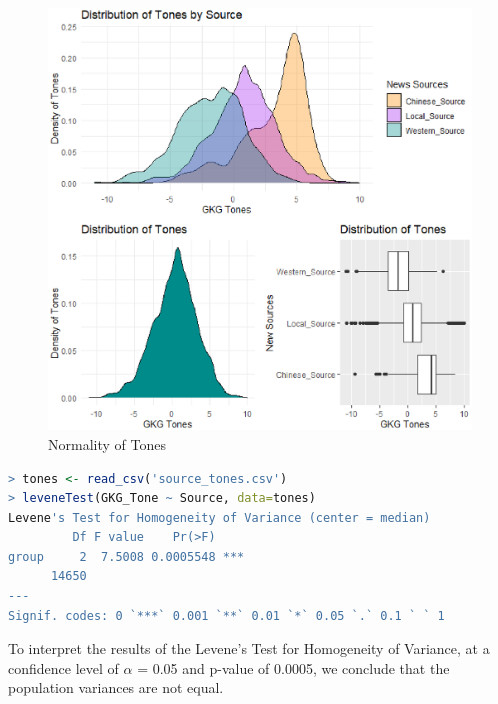 \documentclass[12pt]{article}
\begin{document}
\begin{figure}
	\centering
	\includegraphics[width=\textwidth]{Distribution of Tones GDELT.eps}
	\caption{Normality of Tones}
    \label{fig:Distributions}
\end{figure}

\begin{lstlisting}[language=R,
                    frame=single,
                    basicstyle=\small\ttfamily,
                    stringstyle=\color{DarkGreen},
                    otherkeywords={0,1,2,3,4,5,6,7,8,9},
                    morekeywords={TRUE,FALSE},
                    deletekeywords={data,frame,length,as,character},
                    keywordstyle=\color{None},
                    commentstyle=\color{DarkGreen},
                    showspaces=False,
                    showstringspaces=false,
                    caption= Levene's Test for Homogeneity of Variance,
                    label={lst:R_code_1}]
> tones <- read_csv('source_tones.csv')
> leveneTest(GKG_Tone ~ Source, data=tones)
Levene's Test for Homogeneity of Variance (center = median)
         Df F value    Pr(>F)    
group     2  7.5008 0.0005548 ***
      14650                      
---
Signif. codes: 0 `***` 0.001 `**` 0.01 `*` 0.05 `.` 0.1 ` ` 1
\end{lstlisting}

To interpret the results of the Levene's Test for Homogeneity of Variance, at a confidence level of $\alpha$ = 0.05 and p-value of 0.0005, we conclude that the population variances are not equal.  
\end{document}
